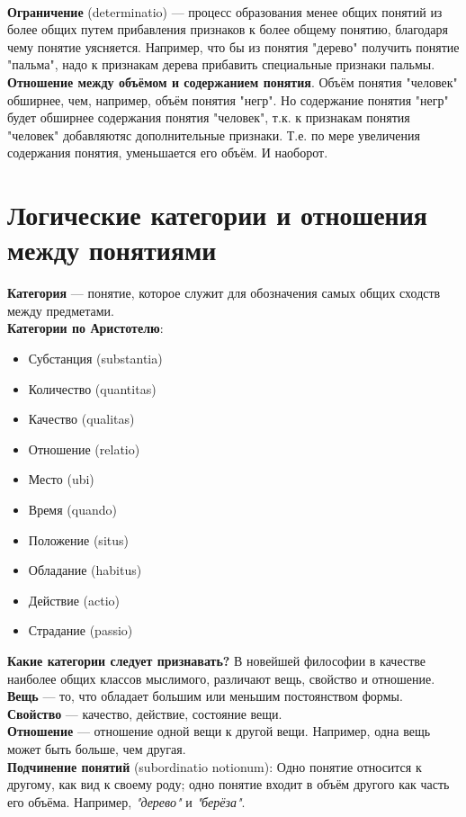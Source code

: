 \documentclass{article}
\begin{document}
\\
\textbf{Ограничение} (determinatio) --- процесс образования менее общих понятий из более общих путем прибавления признаков к более общему понятию, благодаря чему понятие уясняется. Например, что бы из понятия "дерево" получить понятие "пальма", надо к признакам дерева прибавить специальные признаки пальмы.
\\
\textbf{Отношение между объёмом и содержанием понятия}. Объём понятия "человек" обширнее, чем, например, объём понятия "негр". Но содержание понятия "негр" будет обширнее содержания понятия "человек", т.к. к признакам понятия "человек" добавляютяс дополнительные признаки. Т.е. по мере увеличения содержания понятия, уменьшается его объём. И наоборот.

\section{Логические категории и отношения между понятиями}
\textbf{Категория} --- понятие, которое служит для обозначения самых общих сходств между предметами.
\\
\textbf{Категории по Аристотелю}:
\begin{itemize}
\item Субстанция (substantia)
\item Количество (quantitas)
\item Качество (qualitas)
\item Отношение (relatio)
\item Место (ubi)
\item Время (quando)
\item Положение (situs)
\item Обладание (habitus)
\item Действие (actio)
\item Страдание (passio)
\end{itemize}
\textbf{Какие категории следует признавать?} В новейшей философии в качестве наиболее общих классов мыслимого, различают вещь, свойство и отношение.
\\
\textbf{Вещь} --- то, что обладает большим или меньшим постоянством формы.
\\
\textbf{Свойство} --- качество, действие, состояние вещи.
\\
\textbf{Отношение} --- отношение одной вещи к другой вещи. Например, одна вещь может быть больше, чем другая.
\\
\textbf{Подчинение понятий} (subordinatio notionum): Одно понятие относится к другому, как вид к своему роду; одно понятие входит в объём другого как часть его объёма. Например, \textit{"дерево"} и \textit{"берёза"}.
\end{document}

